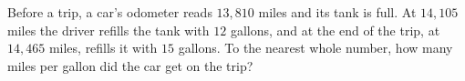 Before a trip, a car's odometer reads $13{,}810$ miles and its tank is full. At $14{,}105$ miles the driver refills the tank with $12$ gallons, and at the end of the trip, at $14{,}465$ miles, refills it with $15$ gallons. To the nearest whole number, how many miles per gallon did the car get on the trip?
